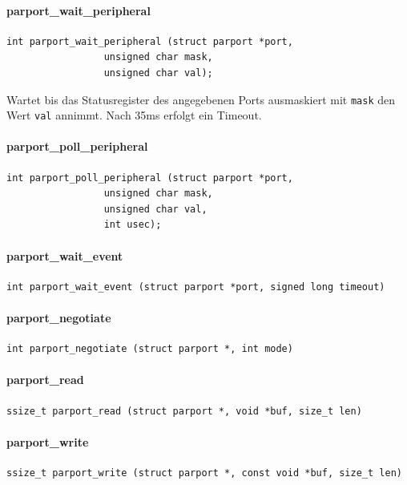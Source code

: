 \documentclass[a4paper,11pt]{article}
\begin{document}
\paragraph{parport\_wait\_peripheral}
\begin{verbatim}
int parport_wait_peripheral (struct parport *port,
			     unsigned char mask,
			     unsigned char val);
\end{verbatim}

Wartet bis das Statusregister des angegebenen Ports ausmaskiert mit \verb|mask| den Wert \verb|val| annimmt.
Nach 35ms erfolgt ein Timeout.

\paragraph{parport\_poll\_peripheral}

\begin{verbatim}
int parport_poll_peripheral (struct parport *port,
			     unsigned char mask,
			     unsigned char val,
			     int usec);
\end{verbatim}


\paragraph{parport\_wait\_event}
\begin{verbatim}
int parport_wait_event (struct parport *port, signed long timeout)
\end{verbatim}


\paragraph{parport\_negotiate}
\begin{verbatim}
int parport_negotiate (struct parport *, int mode)
\end{verbatim}

\paragraph{parport\_read}
\begin{verbatim}
ssize_t parport_read (struct parport *, void *buf, size_t len)
\end{verbatim}

\paragraph{parport\_write}
\begin{verbatim}
ssize_t parport_write (struct parport *, const void *buf, size_t len)
\end{verbatim}
\end{document}
